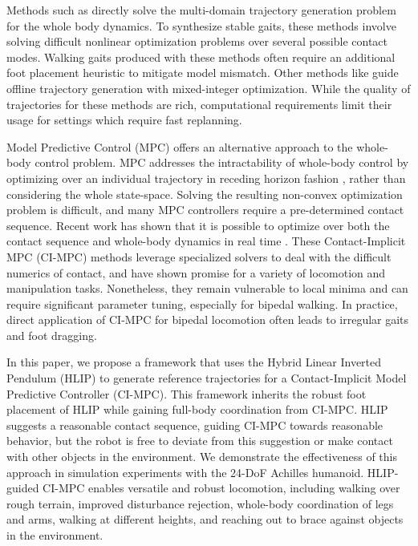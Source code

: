 Methods such as \cite{zhao2017multi,hereid20163d,westervelt_hybrid_2003} directly solve the multi-domain trajectory generation problem for the whole body dynamics. To synthesize stable gaits, these methods involve solving difficult nonlinear optimization problems over several possible contact modes. Walking gaits produced with these methods often require an additional foot placement heuristic to mitigate model mismatch. Other methods like \cite{deits2014footstep, ding2020kinodynamic} guide offline trajectory generation with mixed-integer optimization. While the quality of trajectories for these methods are rich, computational requirements limit their usage for settings which require fast replanning.

Model Predictive Control (MPC) offers an alternative approach to the whole-body control problem. MPC addresses the intractability of whole-body control by optimizing over an individual trajectory in receding horizon fashion \cite{wensing_optimization-based_2024, tassa2012synthesis}, rather than considering the whole state-space. Solving the resulting non-convex optimization problem is difficult, and many MPC controllers require a pre-determined contact sequence. Recent work has shown that it is possible to optimize over both the contact sequence and whole-body dynamics in real time \cite{kurtz2023inverse, cleach_fast_2023, aydinoglu2023consensus, kim2023contact}. These Contact-Implicit MPC (CI-MPC) methods leverage specialized solvers to deal with the difficult numerics of contact, and have shown promise for a variety of locomotion and manipulation tasks. Nonetheless, they remain vulnerable to local minima and can require significant parameter tuning, especially for bipedal walking. In practice, direct application of CI-MPC for bipedal locomotion often leads to irregular gaits and foot dragging.

In this paper, we propose a framework that uses the Hybrid Linear Inverted Pendulum (HLIP) \cite{xiong_orbit_2019} to generate reference trajectories for a Contact-Implicit Model Predictive Controller (CI-MPC). This framework inherits the robust foot placement of HLIP while gaining full-body coordination from CI-MPC. HLIP suggests a reasonable contact sequence, guiding CI-MPC towards reasonable  behavior, but the robot is free to deviate from this suggestion or make contact with other objects in the environment.
We demonstrate the effectiveness of this approach in simulation experiments with the 24-DoF Achilles humanoid. HLIP-guided CI-MPC enables versatile and robust locomotion, including walking over rough terrain, improved disturbance rejection, whole-body coordination of legs and arms, walking at different heights, and reaching out to brace against objects in the environment.

